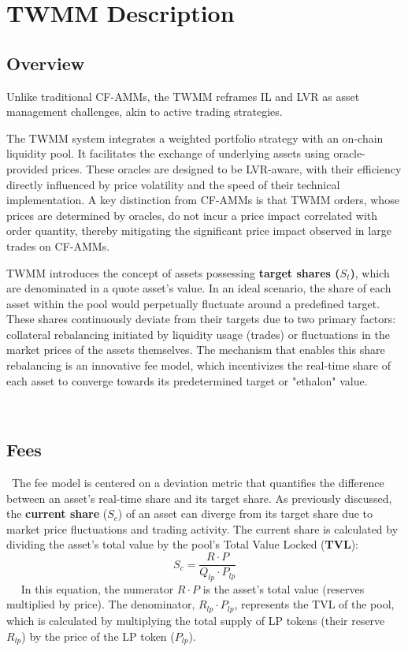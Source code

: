 \section{TWMM Description}
\subsection{Overview}
Unlike traditional CF-AMMs, the TWMM reframes IL and LVR as asset management challenges, akin to active trading strategies.

The TWMM system integrates a weighted portfolio strategy with an on-chain liquidity pool. It facilitates the exchange of underlying assets using oracle-provided prices. These oracles are designed to be LVR-aware, with their efficiency directly influenced by price volatility and the speed of their technical implementation. A key distinction from CF-AMMs is that TWMM orders, whose prices are determined by oracles, do not incur a price impact correlated with order quantity, thereby mitigating the significant price impact observed in large trades on CF-AMMs.

TWMM introduces the concept of assets possessing \textbf{target shares ($S_t$)}, which are denominated in a quote asset's value. In an ideal scenario, the share of each asset within the pool would perpetually fluctuate around a predefined target. These shares continuously deviate from their targets due to two primary factors: collateral rebalancing initiated by liquidity usage (trades) or fluctuations in the market prices of the assets themselves. The mechanism that enables this share rebalancing is an innovative fee model, which incentivizes the real-time share of each asset to converge towards its predetermined target or "ethalon" value.

 \subsection{Fees}
 The fee model is centered on a deviation metric that quantifies the difference between an asset's real-time share and its target share. As previously discussed, the \textbf{current share} ($S_c$) of an asset can diverge from its target share due to market price fluctuations and trading activity. The current share is calculated by dividing the asset's total value by the pool's Total Value Locked (\textbf{TVL}):
 
 \begin{equation}
 	\label{eq:current_share}
 	S_c = \frac{R \cdot P}{ Q_{lp} \cdot P_{lp}}
 \end{equation}
 
 In this equation, the numerator $R \cdot P$ is the asset's total value (reserves multiplied by price). The denominator, $R_{lp} \cdot P_{lp}$, represents the TVL of the pool, which is calculated by multiplying the total supply of LP tokens (their reserve $R_{lp}$) by the price of the LP token ($P_{lp}$).

